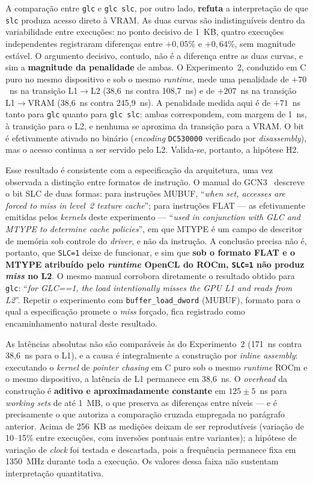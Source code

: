 A comparação entre \texttt{glc} e \texttt{glc slc}, por outro lado, \textbf{refuta} a interpretação de que \texttt{slc} produza acesso direto à VRAM. As duas curvas são indistinguíveis dentro da variabilidade entre execuções: no ponto decisivo de 1~KB, quatro execuções independentes registraram diferenças entre $+0,05$\% e $+0,64$\%, sem magnitude estável. O argumento decisivo, contudo, não é a diferença entre as duas curvas, e sim a \textbf{magnitude da penalidade} de ambas. O Experimento~2, conduzido em C puro no mesmo dispositivo e sob o mesmo \textit{runtime}, mede uma penalidade de $+70$~ns na transição L1$\to$L2 (38,6~ns contra 108,7~ns) e de $+207$~ns na transição L1$\to$VRAM (38,6~ns contra 245,9~ns). A penalidade medida aqui é de $+71$~ns tanto para \texttt{glc} quanto para \texttt{glc slc}: ambas correspondem, com margem de 1~ns, à transição para o L2, e nenhuma se aproxima da transição para a VRAM. O bit é efetivamente ativado no binário (\textit{encoding} \texttt{DC530000} verificado por \textit{disassembly}), mas o acesso continua a ser servido pelo L2. Valida-se, portanto, a hipótese H2.

Esse resultado é consistente com a especificação da arquitetura, uma vez observada a distinção entre formatos de instrução. O manual do GCN3~\cite{amdgcn3} descreve o bit SLC de duas formas: para instruções MUBUF, ``\textit{when set, accesses are forced to miss in level~2 texture cache}''; para instruções FLAT --- as efetivamente emitidas pelos \textit{kernels} deste experimento --- ``\textit{used in conjunction with GLC and MTYPE to determine cache policies}'', em que MTYPE é um campo de descritor de memória sob controle do \textit{driver}, e não da instrução. A conclusão precisa não é, portanto, que \texttt{SLC=1} deixe de funcionar, e sim que \textbf{sob o formato FLAT e o MTYPE atribuído pelo \textit{runtime} OpenCL do ROCm, \texttt{SLC=1} não produz \textit{miss} no L2}. O mesmo manual corrobora diretamente o resultado obtido para \texttt{glc}: ``\textit{for GLC==1, the load intentionally misses the GPU L1 and reads from L2}''. Repetir o experimento com \texttt{buffer\_load\_dword} (MUBUF), formato para o qual a especificação promete o \textit{miss} forçado, fica registrado como encaminhamento natural deste resultado.

As latências absolutas não são comparáveis às do Experimento~2 (171~ns contra 38,6~ns para o L1), e a causa é integralmente a construção por \textit{inline assembly}: executando o \textit{kernel} de \textit{pointer chasing} em C puro sob o mesmo \textit{runtime} ROCm e o mesmo dispositivo, a latência de L1 permanece em 38,6~ns. O \textit{overhead} da construção é \textbf{aditivo e aproximadamente constante} em $125 \pm 5$~ns para \textit{working sets} de até 1~MB, o que preserva as diferenças entre níveis --- e é precisamente o que autoriza a comparação cruzada empregada no parágrafo anterior. Acima de 256~KB as medições deixam de ser reprodutíveis (variação de 10--15\% entre execuções, com inversões pontuais entre variantes); a hipótese de variação de \textit{clock} foi testada e descartada, pois a frequência permanece fixa em 1350~MHz durante toda a execução. Os valores dessa faixa não sustentam interpretação quantitativa.

